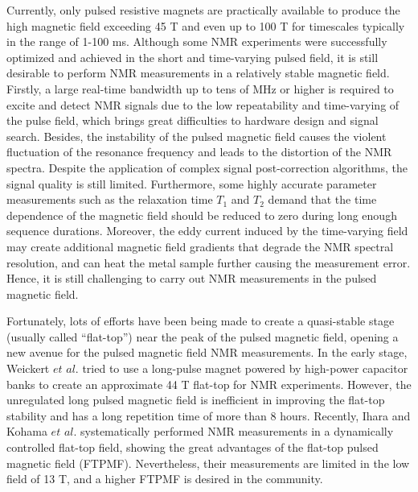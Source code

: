 \documentclass[lettersize,journal]{IEEEtran}
\begin{document}
Currently, only pulsed resistive magnets are practically available to produce the high magnetic field exceeding 45 T and even up to 100 T for timescales typically in the range of 1-100 ms\cite{ref22,ref23}. Although some NMR experiments were successfully optimized and achieved in the short and time-varying pulsed field\cite{ref6,ref7,ref8,ref9,ref10,ref11,ref12,ref13,ref14,ref15,ref16}, it is still desirable to perform NMR measurements in a relatively stable magnetic field\cite{ref17,ref18,ref24}. Firstly, a large real-time bandwidth up to tens of MHz or higher is required to excite and detect NMR signals due to the low repeatability and time-varying of the pulse field, which brings great difficulties to hardware design and signal search\cite{ref25}. Besides, the instability of the pulsed magnetic field causes the violent fluctuation of the resonance frequency and leads to the distortion of the NMR spectra. Despite the application of complex signal post-correction algorithms, the signal quality is still limited\cite{ref13,ref15}. Furthermore, some highly accurate parameter measurements such as the relaxation time $T_1$ and $T_2$ demand that the time dependence of the magnetic field should be reduced to zero during long enough sequence durations\cite{ref24}. Moreover, the eddy current induced by the time-varying field may create additional magnetic field gradients that degrade the NMR spectral resolution, and can heat the metal sample further causing the measurement error. Hence, it is still challenging to carry out NMR measurements in the pulsed magnetic field.

Fortunately, lots of efforts have been being made to create a quasi-stable stage (usually called “flat-top”) near the peak of the pulsed magnetic field\cite{ref26,ref27,ref28,ref29,ref30,ref31,ref32}, opening a new avenue for the pulsed magnetic field NMR measurements\cite{ref18}. In the early stage, Weickert $et$ $al.$\cite{ref26} tried to use a long-pulse magnet powered by high-power capacitor banks to create an approximate 44 T flat-top for NMR experiments. However, the unregulated long pulsed magnetic field is inefficient in improving the flat-top stability and has a long repetition time of more than 8 hours. Recently, Ihara and Kohama $et$ $al.$\cite{ref17,ref24} systematically performed NMR measurements in a dynamically controlled flat-top field, showing the great advantages of the flat-top pulsed magnetic field (FTPMF). Nevertheless, their measurements are limited in the low field of 13 T, and a higher FTPMF is desired in the community.
\end{document}
